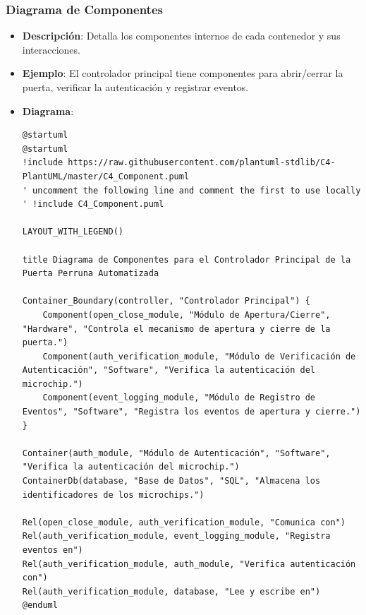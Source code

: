 \subsubsection{Diagrama de Componentes}
\begin{itemize}
    \item \textbf{Descripción}: Detalla los componentes internos de cada contenedor y sus interacciones.
    \item \textbf{Ejemplo}: El controlador principal tiene componentes para abrir/cerrar la puerta, verificar la autenticación y registrar eventos.
    \item \textbf{Diagrama}:
\begin{verbatim}
@startuml
@startuml
!include https://raw.githubusercontent.com/plantuml-stdlib/C4-PlantUML/master/C4_Component.puml
' uncomment the following line and comment the first to use locally
' !include C4_Component.puml

LAYOUT_WITH_LEGEND()

title Diagrama de Componentes para el Controlador Principal de la Puerta Perruna Automatizada

Container_Boundary(controller, "Controlador Principal") {
    Component(open_close_module, "Módulo de Apertura/Cierre", "Hardware", "Controla el mecanismo de apertura y cierre de la puerta.")
    Component(auth_verification_module, "Módulo de Verificación de Autenticación", "Software", "Verifica la autenticación del microchip.")
    Component(event_logging_module, "Módulo de Registro de Eventos", "Software", "Registra los eventos de apertura y cierre.")
}

Container(auth_module, "Módulo de Autenticación", "Software", "Verifica la autenticación del microchip.")
ContainerDb(database, "Base de Datos", "SQL", "Almacena los identificadores de los microchips.")

Rel(open_close_module, auth_verification_module, "Comunica con")
Rel(auth_verification_module, event_logging_module, "Registra eventos en")
Rel(auth_verification_module, auth_module, "Verifica autenticación con")
Rel(auth_verification_module, database, "Lee y escribe en")
@enduml
\end{verbatim}
\end{itemize}

